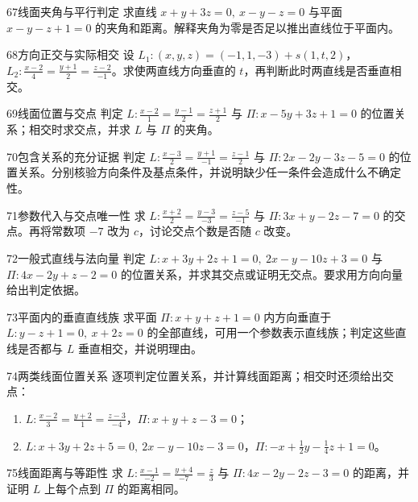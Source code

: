 \begin{exercise}{67}{线面夹角与平行判定}
求直线 $x+y+3z=0,\ x-y-z=0$ 与平面 $x-y-z+1=0$ 的夹角和距离。解释夹角为零是否足以推出直线位于平面内。
\end{exercise}
\begin{exercise}{68}{方向正交与实际相交}
设 $L_1:(x,y,z)=(-1,1,-3)+s(1,t,2)$，$L_2:\frac{x-2}{4}=\frac{y+1}{2}=\frac{z-2}{-1}$。求使两直线方向垂直的 $t$，再判断此时两直线是否垂直相交。
\end{exercise}
\begin{exercise}{69}{线面位置与交点}
判定 $L:\frac{x-2}{1}=\frac{y-1}{2}=\frac{z+1}{2}$ 与 $\Pi:x-5y+3z+1=0$ 的位置关系；相交时求交点，并求 $L$ 与 $\Pi$ 的夹角。
\end{exercise}
\begin{exercise}{70}{包含关系的充分证据}
判定 $L:\frac{x-3}{2}=\frac{y+1}{-1}=\frac{z-1}{2}$ 与 $\Pi:2x-2y-3z-5=0$ 的位置关系。分别核验方向条件及基点条件，并说明缺少任一条件会造成什么不确定性。
\end{exercise}
\begin{exercise}{71}{参数代入与交点唯一性}
求 $L:\frac{x+2}{2}=\frac{y-3}{-3}=\frac{z-5}{-1}$ 与 $\Pi:3x+y-2z-7=0$ 的交点。再将常数项 $-7$ 改为 $c$，讨论交点个数是否随 $c$ 改变。
\end{exercise}
\begin{exercise}{72}{一般式直线与法向量}
判定 $L:x+3y+2z+1=0,\ 2x-y-10z+3=0$ 与 $\Pi:4x-2y+z-2=0$ 的位置关系，并求其交点或证明无交点。要求用方向向量给出判定依据。
\end{exercise}
\begin{exercise}{73}{平面内的垂直直线族}
求平面 $\Pi:x+y+z+1=0$ 内方向垂直于 $L:y-z+1=0,\ x+2z=0$ 的全部直线，可用一个参数表示直线族；判定这些直线是否都与 $L$ 垂直相交，并说明理由。
\end{exercise}
\begin{exercise}{74}{两类线面位置关系}
逐项判定位置关系，并计算线面距离；相交时还须给出交点：
\begin{enumerate}
\item $L:\frac{x-2}{3}=\frac{y+2}{1}=\frac{z-3}{-4}$，$\Pi:x+y+z-3=0$；
\item $L:x+3y+2z+5=0,\ 2x-y-10z-3=0$，$\Pi:-x+\frac12y-\frac14z+1=0$。
\end{enumerate}
\end{exercise}
\begin{exercise}{75}{线面距离与等距性}
求 $L:\frac{x-1}{-2}=\frac{y+4}{-7}=\frac z3$ 与 $\Pi:4x-2y-2z-3=0$ 的距离，并证明 $L$ 上每个点到 $\Pi$ 的距离相同。
\end{exercise}
